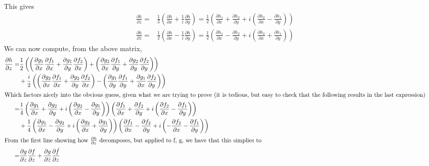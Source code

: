 \documentclass[12pt,letterpaper]{article}
\theoremstyle{definition}
\begin{document}
This gives
\begin{align*}
  \frac{\partial h}{\partial z} =& \frac{1}{2}\left( \frac{\partial h}{\partial x} + \frac{1}{i}\frac{\partial h}{\partial y} \right) = \frac{1}{2}\left( \frac{\partial h_{1}}{\partial x} + \frac{\partial h_{2}}{\partial y} + i\left(\frac{\partial h_{2}}{\partial x} - \frac{\partial h_{1}}{\partial y}\right)\right)\\
  \frac{\partial h}{\partial \bar{z}} =& \frac{1}{2}\left( \frac{\partial h}{\partial x} - \frac{1}{i}\frac{\partial h}{\partial y} \right) = \frac{1}{2}\left( \frac{\partial h_{1}}{\partial x} - \frac{\partial h_{2}}{\partial y} + i\left(\frac{\partial h_{2}}{\partial x} + \frac{\partial h_{1}}{\partial y}\right)\right)
\end{align*}
We can now compute, from the above matrix,
\begin{align*}
  \frac{\partial h}{\partial z} =& \frac{1}{2}\left(\left(\frac{\partial g_{1}}{\partial x}\frac{\partial f_{1}}{\partial x} + \frac{\partial g_{1}}{\partial y}\frac{\partial f_{2}}{\partial x}\right) + \left(\frac{\partial g_{2}}{\partial x}\frac{\partial f_{1}}{\partial y} + \frac{\partial g_{2}}{\partial y}\frac{\partial f_{2}}{\partial y}\right)\right) \\
  &+ \frac{i}{2}\left(\left(\frac{\partial g_{2}}{\partial x}\frac{\partial f_{1}}{\partial x} + \frac{\partial g_{2}}{\partial y}\frac{\partial f_{2}}{\partial x}\right) - \left(\frac{\partial g_{1}}{\partial y}\frac{\partial f_{1}}{\partial y} + \frac{\partial g_{1}}{\partial x}\frac{\partial f_{2}}{\partial y}\right)\right) \\
  \intertext{Which factors nicely into the obvious guess, given what we are trying to prove (it is tedious, but easy to check that the following results in the last expression)}
  =& \frac{1}{4}\left(\frac{\partial g_{1}}{\partial x} + \frac{\partial g_{2}}{\partial y} + i\left(\frac{\partial g_{2}}{\partial x} - \frac{\partial g_{1}}{\partial y}\right)\right)\left(\frac{\partial f_{1}}{\partial x} + \frac{\partial f_{2}}{\partial y} + i\left(\frac{\partial f_{2}}{\partial x} - \frac{\partial f_{1}}{\partial y}\right)\right) \\
  &+ \frac{1}{4}\left(\frac{\partial g_{1}}{\partial x} - \frac{\partial g_{2}}{\partial y} + i\left(\frac{\partial g_{2}}{\partial x} + \frac{\partial g_{1}}{\partial y}\right)\right)\left(\frac{\partial f_{1}}{\partial x} - \frac{\partial f_{2}}{\partial y} + i\left(-\frac{\partial f_{2}}{\partial x} - \frac{\partial f_{1}}{\partial y}\right)\right) \\
  \intertext{From the first line showing how $\frac{\partial h}{\partial z}$ decomposes, but applied to f, g, we have that this simplies to}
  =& \frac{\partial g}{\partial z}\frac{\partial f}{\partial z} + \frac{\partial g}{\partial \bar{z}}\frac{\partial \bar{f}}{\partial z}
\end{align*}
\end{document}
